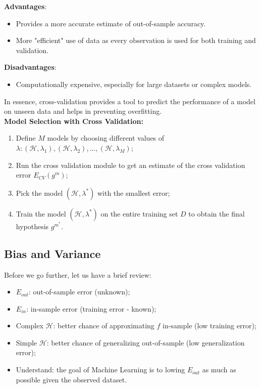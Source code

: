 \documentclass{article}
\begin{document}
\textbf{Advantages}:
\begin{itemize}
    \item Provides a more accurate estimate of out-of-sample accuracy.
    \item More "efficient" use of data as every observation is used for both training and validation.
\end{itemize}

\textbf{Disadvantages}:
\begin{itemize}
    \item Computationally expensive, especially for large datasets or complex models.
\end{itemize}

In essence, cross-validation provides a tool to predict the performance of a model on unseen data and helps in preventing overfitting.\\

\textbf{Model Selection with Cross Validation:}
\begin{enumerate}
    \item Define $M$ models by choosing different values of $\lambda: (\mathcal{H}, \lambda_{1}), (\mathcal{H}, \lambda_{2}), ..., (\mathcal{H}, \lambda_{M})$;
    \item Run the cross validation module to get an estimate of the cross validation error $E_{CV}(g^{m})$;
    \item Pick the model $(\mathcal{H}, \lambda^{*})$ with the smallest error;
    \item Train the model $(\mathcal{H}, \lambda^{*})$ on the entire training set $D$ to obtain the final hypothesis $g^{m^{*}}$.
\end{enumerate}

\subsection{Bias and Variance}
Before we go further, let us have a brief review:
\begin{itemize}
    \item $E_{out}$: out-of-sample error (unknown);
    \item $E_{in}$: in-sample error (training error - known);
    \item Complex $\mathcal{H}$: better chance of approximating $f$ in-sample (low training error);
    \item Simple $\mathcal{H}$: better chance of generalizing out-of-sample (low generalization error);
    \item Understand: the goal of Machine Learning is to lowing $E_{out}$ as much as possible given the observed dataset.
\end{itemize}
\end{document}
